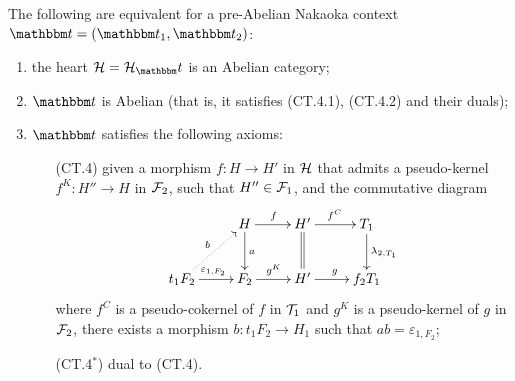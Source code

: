 \begin{thm}
The following are equivalent for a pre-Abelian Nakaoka context $\t=(\t_1,\t_2)$:
\begin{enumerate}[label=(\alph*)]
\item the heart $\clH=\clH_\t$ is an Abelian category;
\item $\t$ is Abelian (that is, it satisfies (CT.4.1), (CT.4.2) and their duals);
\item $\t$ satisfies the following axioms:
\begin{itemize}
\item[(CT.4)] given a morphism $f\colon H\to H'$ in $\mathcal{H}$ that admits a pseudo-kernel $f^K\colon H''\to H$ in $\mathcal{F}_2$, such that $H''\in \mathcal{F}_1$, and the commutative diagram
\begin{equation*}
\xymatrix{
 & H\ar[d]^{a}\ar[r]^{f} & H'\ar@{=}[d]\ar[r]^{f^C} & T_1\ar[d]^{\lambda_{2,T_1}}\\
t_1F_2\ar@{.>}[ur]^{b}\ar[r]^{\varepsilon_{1,F_2}} & F_2\ar[r]^{g^K} & H'\ar[r]^{g} & f_2T_1
}
\end{equation*}
where $f^C$  is a pseudo-cokernel of $f$ in $\mathcal{T}_1$ and $g^K$ is a pseudo-kernel of $g$ in $\mathcal{F}_2$, there exists a morphism $b\colon t_1F_2\to H_1$ such that $ab=\varepsilon_{1,F_2}$;
\item[(CT.4$^*$)] dual to (CT.4).
\end{itemize}
\end{enumerate}
\end{thm}
